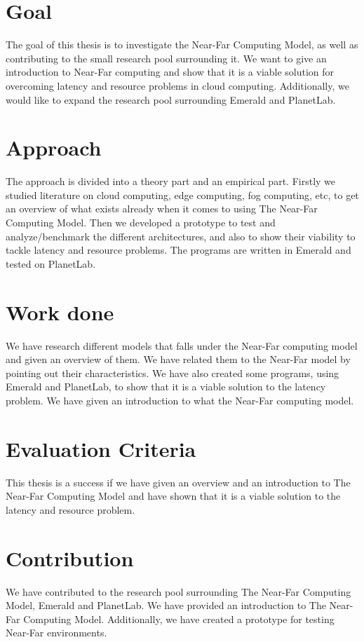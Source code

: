 \section{Goal}
The goal of this thesis is to investigate the Near-Far Computing Model, as well as contributing to the small research pool surrounding it. We want to give an introduction to Near-Far computing and show that it is a viable solution for overcoming latency and resource problems in cloud computing. Additionally, we would like to expand the research pool surrounding Emerald and PlanetLab.

\section{Approach}
The approach is divided into a theory part and an empirical part. Firstly we studied literature on cloud computing, edge computing, fog computing, etc, to get an overview of what exists already when it comes to using The Near-Far Computing Model. Then we developed a prototype to test and analyze/benchmark the different architectures, and also to show their viability to tackle latency and resource problems. The programs are written in Emerald and tested on PlanetLab.


\section{Work done}
We have research different models that falls under the Near-Far computing model and given an overview of them. We have related them to the Near-Far model by pointing out their characteristics. We have also created some programs, using Emerald and PlanetLab, to show that it is a viable solution to the latency problem. We have given an introduction to what the Near-Far computing model.

\section{Evaluation Criteria}
This thesis is a success if we have given an overview and an introduction to The Near-Far Computing Model and have shown that it is a viable solution to the latency and resource problem.

\section{Contribution}
We have contributed to the research pool surrounding The Near-Far Computing Model, Emerald and PlanetLab. We have provided an introduction to The Near-Far Computing Model. Additionally, we have created a prototype for testing Near-Far environments. 

